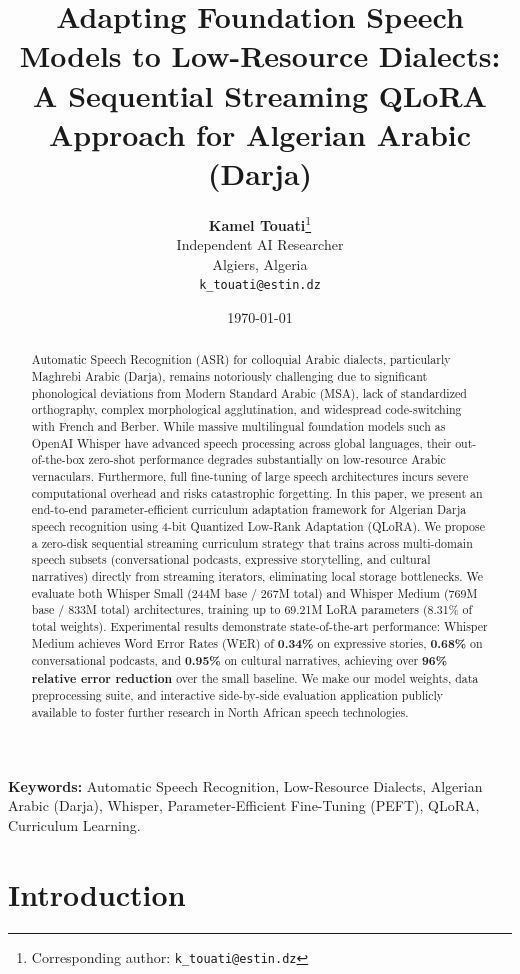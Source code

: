 \documentclass[11pt,a4paper]{article}
\title{\textbf{Adapting Foundation Speech Models to Low-Resource Dialects: A Sequential Streaming QLoRA Approach for Algerian Arabic (Darja)}}
\author{
    \textbf{Kamel Touati}\thanks{Corresponding author: \texttt{k\_touati@estin.dz}} \\
    Independent AI Researcher \\
    Algiers, Algeria \\
    \texttt{k\_touati@estin.dz}
}
\date{\today}
\begin{document}
\maketitle

\begin{abstract}
Automatic Speech Recognition (ASR) for colloquial Arabic dialects, particularly Maghrebi Arabic (Darja), remains notoriously challenging due to significant phonological deviations from Modern Standard Arabic (MSA), lack of standardized orthography, complex morphological agglutination, and widespread code-switching with French and Berber. While massive multilingual foundation models such as OpenAI Whisper have advanced speech processing across global languages, their out-of-the-box zero-shot performance degrades substantially on low-resource Arabic vernaculars. Furthermore, full fine-tuning of large speech architectures incurs severe computational overhead and risks catastrophic forgetting. In this paper, we present an end-to-end parameter-efficient curriculum adaptation framework for Algerian Darja speech recognition using 4-bit Quantized Low-Rank Adaptation (QLoRA). We propose a zero-disk sequential streaming curriculum strategy that trains across multi-domain speech subsets (conversational podcasts, expressive storytelling, and cultural narratives) directly from streaming iterators, eliminating local storage bottlenecks. We evaluate both Whisper Small (244M base / 267M total) and Whisper Medium (769M base / 833M total) architectures, training up to 69.21M LoRA parameters (8.31\% of total weights). Experimental results demonstrate state-of-the-art performance: Whisper Medium achieves Word Error Rates (WER) of \textbf{0.34\%} on expressive stories, \textbf{0.68\%} on conversational podcasts, and \textbf{0.95\%} on cultural narratives, achieving over \textbf{96\% relative error reduction} over the small baseline. We make our model weights, data preprocessing suite, and interactive side-by-side evaluation application publicly available to foster further research in North African speech technologies.
\end{abstract}

\vspace{0.5cm}
\noindent\textbf{Keywords:} Automatic Speech Recognition, Low-Resource Dialects, Algerian Arabic (Darja), Whisper, Parameter-Efficient Fine-Tuning (PEFT), QLoRA, Curriculum Learning.

\section{Introduction}
\label{sec:introduction}
\end{document}
